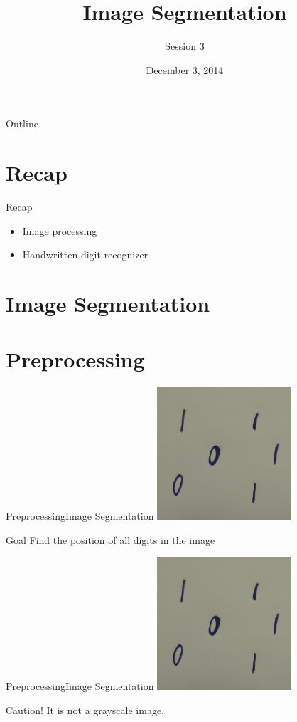 \documentclass{beamer}
\title{Image Segmentation}
\subtitle{Session 3}
\institute[Computer Vision Group]
{
    Computer Vision Group\\
    IIT Madras
}
\date{December 3, 2014}
\begin{document}
\begin{frame}
  \titlepage
\end{frame}

\begin{frame}{Outline}
  \tableofcontents
\end{frame}

\section{Recap}

\begin{frame}{Recap}
  \begin{itemize}
  \item {
    Image processing
  }
  \pause
  \item {
    Handwritten digit recognizer
  }
  \end{itemize}
\end{frame}

\section{Image Segmentation}
\section{Preprocessing}
\begin{frame}{Preprocessing}{Image Segmentation}
\centering
    \includegraphics[width=50mm]{./one_zero_image.jpg}

\begin{block}{Goal}
Find the position of all digits in the image
\end{block}
\end{frame}

\begin{frame}{Preprocessing}{Image Segmentation}
\centering
    \includegraphics[width=50mm]{./one_zero_image.jpg}

\begin{block}{Caution!}
It is not a grayscale image.
\end{block}

\end{frame}
\end{document}
